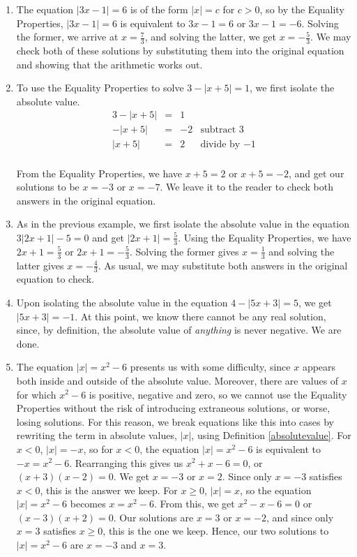 {
\begin{enumerate}

\item  The equation  $|3x-1| = 6$ is of the form $|x| = c$ for $c>0$, so by the Equality Properties, $|3x-1| = 6$ is equivalent to $3x-1=6$ or $3x-1 = -6$.  Solving the former, we arrive at $x = \frac{7}{3}$, and solving the latter, we get $x = -\frac{5}{3}$.  We may check both of these solutions by substituting them into the original equation and showing that the arithmetic works out.

\item  To use the Equality Properties to solve $3 - |x+5| = 1$, we first isolate the absolute value. \[ \begin{array}{rclr}

3 - |x+5| & = & 1 &  \\
-|x+5| & = & -2 & \text{subtract $3$} \\
|x+5| & = & 2 & \text{divide by $-1$}  \\ 

\end{array} \]

From the Equality Properties, we have $x+5 = 2$ or $x+5 = -2$, and get our solutions to be $x = -3$ or $x = -7$.  We leave it to the reader to check both answers in the original equation.

\item As in the previous example, we first isolate the absolute value in the equation $3|2x+1| - 5 = 0$ and get $|2x+1| = \frac{5}{3}$.  Using the Equality Properties, we have $2x+1 = \frac{5}{3}$ or $2x+1 = -\frac{5}{3}$.  Solving the former gives $x = \frac{1}{3}$ and solving the latter gives $x = -\frac{4}{3}$.  As usual, we may substitute both answers in the original equation to check.

\item  Upon isolating the absolute value in the equation $4 - |5x+3| = 5$, we get $|5x+3| = -1$.  At this point, we know there cannot be any real solution, since, by definition, the absolute value of \textit{anything} is never negative.  We are done. 


\item  The equation  $|x| = x^2-6$ presents us with some difficulty, since $x$ appears both inside and outside of the absolute value. Moreover, there are values of $x$ for which $x^2-6$ is positive, negative and zero, so we cannot use the Equality Properties without the risk of introducing extraneous solutions, or worse, losing solutions.  For this reason, we break equations like this into cases  by rewriting the term in absolute values, $|x|$, using Definition \ref{absolutevalue}.  For $x < 0$, $|x| = -x$, so for $x < 0$, the equation $|x| = x^2-6$ is equivalent to $-x = x^2-6$.  Rearranging this gives us $x^2+x-6 = 0$, or $(x+3)(x-2) = 0$.  We get $x = -3$ or $x=2$.  Since only $x=-3$ satisfies $x<0$, this is the answer we keep. For $x \geq 0$, $|x| = x$, so the equation $|x| = x^2-6$ becomes $x = x^2-6$.  From this, we get $x^2-x-6 =0$ or $(x-3)(x+2) = 0$.  Our solutions are $x=3$ or $x = -2$, and since only $x=3$ satisfies $x \geq 0$, this is the one we keep.  Hence, our two solutions to $|x| = x^2-6$ are $x=-3$ and $x=3$.


\end{enumerate}}
